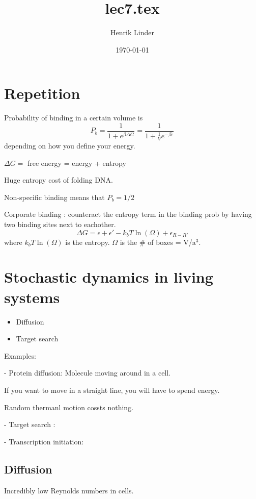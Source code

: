 \documentclass{article}
\title{lec7.tex }
\author{Henrik Linder}
\date{\today}
\begin{document}
\maketitle


\section{Repetition}
Probability of binding in a certain volume is 
\begin{equation}
	P_b = \frac{1}{1 + e ^ {\beta\Delta G}} = \frac{1}{1 + \frac{1}{V}e ^ {-\beta\epsilon}}
\end{equation}
depending on how you define your energy. 


$\Delta G = $ free energy = energy + entropy

Huge entropy cost of folding DNA.

Non-specific binding means that $P_b = 1/2$ 


Corporate binding : counteract the entropy term in the binding prob by having two binding sites next to eachother. 
\begin{equation}
	\Delta G  = \epsilon + \epsilon ' - k_b T \ln(\Omega) + \epsilon _{R - R'}
\end{equation}
where $k_b T \ln(\Omega)$ is the entropy. $\Omega$ is the \# of boxes = V/a$^3$.



\section{Stochastic dynamics in living systems}
\begin{itemize}
	\item Diffusion
	\item Target search
\end{itemize}

Examples: 

- Protein diffusion: 
	Molecule moving around in a cell. 

	If you want to move in a straight line, you will have to spend energy. 

	Random thermanl motion cossts nothing. 

- Target search :
	

- Transcription initiation: 
	


\subsection{Diffusion}
Incredibly low Reynolds numbers in cells. 
\end{document}
